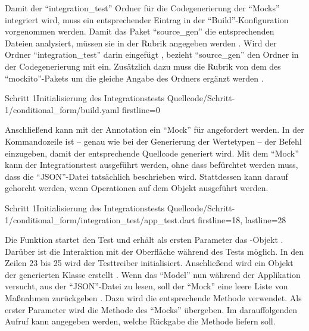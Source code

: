 Damit der \enquote{integration_test} Ordner für die Codegenerierung der \enquote{Mocks} integriert wird, muss ein entsprechender Eintrag in der \enquote{Build}-Konfiguration vorgenommen werden.
Damit das Paket \enquote{source_gen} die entsprechenden Dateien analysiert, müssen sie in der Rubrik  angegeben werden .
Wird der Ordner \enquote{integration_test} darin eingefügt , bezieht \enquote{source_gen} den Ordner in der Codegenerierung mit ein.
Zusätzlich dazu muss die Rubrik  von dem  des \enquote{mockito}-Pakets  um die gleiche Angabe des Ordners ergänzt werden .

\begin{alexyamllisting}{Schritt 1}{Initialisierung des Integrationstests}
  {Quellcode/Schritt-1/conditional_form/build.yaml}
  {firstline=0}
  \label{lst:Schritt1IntegrationsTestInitialisierung}
\end{alexyamllisting}

Anschließend kann mit der Annotation   ein \enquote{Mock} für  angefordert werden.
In der Kommandozeile ist -- genau wie bei der Generierung der Wertetypen -- der Befehl  einzugeben, damit der entsprechende Quellcode generiert wird.
Mit dem \enquote{Mock} kann der Integrationstest ausgeführt werden, ohne dass befürchtet werden muss, dass die \enquote{JSON}-Datei tatsächlich beschrieben wird.
Stattdessen kann darauf gehorcht werden, wenn Operationen auf dem Objekt ausgeführt werden. 

\begin{alexlisting}{Schritt 1}{Initialisierung des Integrationstests}
  {Quellcode/Schritt-1/conditional_form/integration_test/app_test.dart}
  {firstline=18, lastline=28}
  \label{lst:Schritt1IntegrationsTestInitialisierung}
\end{alexlisting}

Die Funktion  startet den Test und erhält als ersten Parameter das -Objekt .
Darüber ist die Interaktion mit der Oberfläche während des Tests möglich.
In den Zeilen 23 bis 25 wird der Testtreiber initialisiert.
Anschließend wird ein Objekt der generierten Klasse  erstellt .
Wenn das \enquote{Model} nun während der Applikation versucht, aus der \enquote{JSON}-Datei zu lesen, soll der \enquote{Mock} eine leere Liste von Maßnahmen zurückgeben .
Dazu wird die entsprechende Methode  verwendet.
Als erster Parameter wird die Methode  des \enquote{Mocks} übergeben.
Im darauffolgenden Aufruf  kann angegeben werden, welche Rückgabe die Methode liefern soll.

